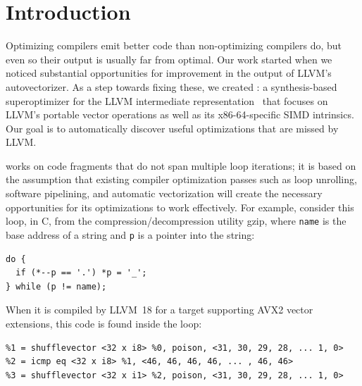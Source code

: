 \section{Introduction}

Optimizing compilers emit better code than non-optimizing compilers
do, but even so their output is usually far from optimal.
%
Our work started when we noticed substantial opportunities for
improvement in the output of LLVM's autovectorizer.
%
As a step towards fixing these, we created \minotaur{}: a synthesis-based
superoptimizer for the LLVM intermediate
representation~\cite{llvm} that focuses on LLVM's portable
vector operations as well as its x86-64-specific SIMD intrinsics.
%
Our goal is to automatically discover useful optimizations that are
missed by LLVM\@.


\minotaur{} works on code fragments that do not span multiple loop
iterations; it is based on the assumption that existing compiler
optimization passes such as loop unrolling, software pipelining, and
automatic vectorization will create the necessary opportunities for
its optimizations to work effectively.
%
For example, consider this loop, in C, from the
compression/decompression utility gzip, where \texttt{name} is the
base address of a string and \texttt{p} is a pointer into the string:

{\begin{quoting}
\begin{Verbatim}
do {
  if (*--p == '.') *p = '_';
} while (p != name);
\end{Verbatim}
\end{quoting}}

When it is compiled by LLVM~18 for a target supporting AVX2
vector extensions, this code is found inside the loop:

{\begin{quoting}
\begin{Verbatim}
%1 = shufflevector <32 x i8> %0, poison, <31, 30, 29, 28, ... 1, 0>
%2 = icmp eq <32 x i8> %1, <46, 46, 46, 46, ... , 46, 46>
%3 = shufflevector <32 x i1> %2, poison, <31, 30, 29, 28, ... 1, 0>
\end{Verbatim}
\end{quoting}}

